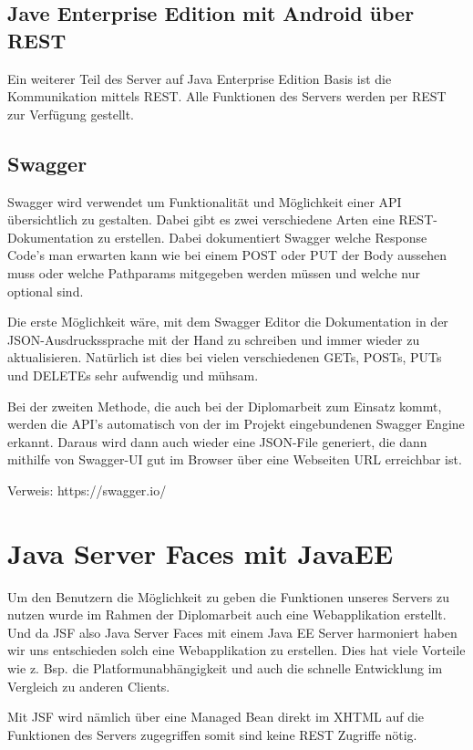 \subsection{Jave Enterprise Edition mit Android über REST}\label{sec:javaeeandroidrest}
Ein weiterer Teil des Server auf Java Enterprise Edition Basis ist die Kommunikation mittels REST. Alle Funktionen des Servers werden per REST zur Verfügung gestellt.

\subsection{Swagger}\label{sec:javaeeandroidrestswagger}
Swagger wird verwendet um Funktionalität und Möglichkeit einer API übersichtlich zu gestalten. Dabei gibt es zwei verschiedene Arten eine REST-Dokumentation zu erstellen.
Dabei dokumentiert Swagger welche Response Code's man erwarten kann wie bei einem POST oder PUT der Body aussehen muss oder welche Pathparams mitgegeben werden müssen und welche nur optional sind.  

Die erste Möglichkeit wäre, mit dem Swagger Editor die Dokumentation in der JSON-Ausdruckssprache mit der Hand zu schreiben und immer wieder zu aktualisieren. Natürlich ist dies bei vielen verschiedenen GETs, POSTs, PUTs und DELETEs sehr aufwendig und mühsam.

Bei der zweiten Methode, die auch bei der Diplomarbeit zum Einsatz kommt, werden die API's automatisch von der im Projekt eingebundenen Swagger Engine erkannt. Daraus wird dann auch wieder eine JSON-File generiert, die dann mithilfe von Swagger-UI gut im Browser über eine Webseiten URL erreichbar ist.


Verweis: https://swagger.io/

\section{Java Server Faces mit JavaEE}\label{sec:javaeejsf}
Um den Benutzern die Möglichkeit zu geben die Funktionen unseres Servers zu nutzen wurde im Rahmen der Diplomarbeit auch eine Webapplikation erstellt. Und da JSF also Java Server Faces mit einem Java EE Server harmoniert haben wir uns entschieden solch eine Webapplikation zu erstellen. Dies hat viele Vorteile wie z. Bsp. die Platformunabhängigkeit und auch die schnelle Entwicklung im Vergleich zu anderen Clients. 

Mit JSF wird nämlich über eine Managed Bean direkt im XHTML auf die Funktionen des Servers zugegriffen somit sind keine REST Zugriffe nötig.

